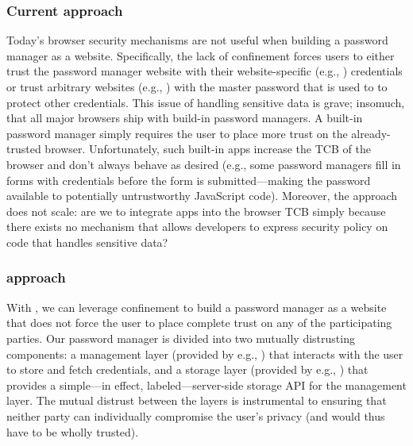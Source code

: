 \subsubsection{Current approach}
%
Today's browser security mechanisms are not useful when building a
password manager as a website.
%
Specifically, the lack of confinement forces users to either trust the
password manager website with their website-specific (e.g.,
) credentials or trust arbitrary websites (e.g.,
) with the master password that is used to to protect
other credentials.
%
This issue of handling sensitive data is grave; insomuch, that all
major browsers ship with build-in password managers.
%
A built-in password manager simply requires the user to place more
trust on the already-trusted browser.
%
Unfortunately, such built-in apps increase the TCB of the browser and
don't always behave as desired (e.g., some password managers fill in
forms with credentials before the form is submitted---making the
password available to potentially untrustworthy JavaScript code).
%
Moreover, the approach does not scale: are we to integrate apps into
the browser TCB simply because there exists no mechanism that allows
developers to express security policy on code that handles sensitive
data?

\subsubsection{\sys{} approach}
%
With \sys{}, we can leverage confinement to build a password manager
as a website that does not force the user to place complete trust on
any of the participating parties.
%
Our password manager is divided into two mutually distrusting
components: a management layer (provided by e.g., )
that interacts with the user to store and fetch credentials, and a
storage layer (provided by e.g., ) that provides a
simple---in effect, labeled---server-side storage API for the
management layer.
%
The mutual distrust between the layers is instrumental to ensuring
that neither party can individually compromise the user's privacy (and
would thus have to be wholly trusted).
%

